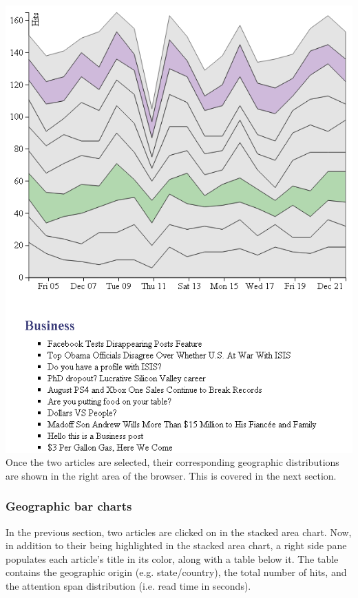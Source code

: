 \documentclass[12pt]{article}
\begin{document}
{\noindent\includegraphics[scale=0.65]{img/viz_7} \\

\noindent Once the two articles are selected, their corresponding geographic distributions are shown in the right area of the browser. This is covered in the next section. 

\newpage

\subsubsection{Geographic bar charts}

In the previous section, two articles are clicked on in the stacked area chart. Now, in addition to their being highlighted in the stacked area chart, a right side pane populates each article's title in its color, along with a table below it. The table contains the geographic origin (e.g. state/country), the total number of hits, and the attention span distribution (i.e. read time in seconds).\\

}
\end{document}
